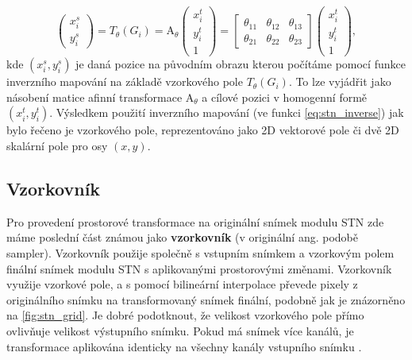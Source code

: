 \begin{equation}
\begin{pmatrix}
x_i^s \\
y_i^s
\end{pmatrix}
= T_{\theta}(G_i) = {\displaystyle \mathrm {A} }_\theta
\begin{pmatrix}
x_i^t \\
y_i^t \\
1
\end{pmatrix}
= 
\begin{bmatrix}
\theta_{11} & \theta_{12} & \theta_{13} \\
\theta_{21} & \theta_{22} & \theta_{23}
\end{bmatrix}
\begin{pmatrix}
x_i^t \\
y_i^t \\
1
\end{pmatrix},
\label{eq:stn_inverse}
\end{equation}
kde $(x_i^s, y_i^s)$ je daná pozice na původním obrazu kterou počítáme pomocí funkce inverzního mapování na základě vzorkového pole $T_{\theta}(G_i)$. To lze vyjádřit jako násobení matice afinní transformace ${\displaystyle \mathrm {A} }_\theta$ a cílové pozici v homogenní formě $(x_i^t, y_i^t)$. Výsledkem použití inverzního mapování (ve funkci \ref{eq:stn_inverse}) jak bylo řečeno je vzorkového pole, reprezentováno jako 2D vektorové pole či dvě 2D skalární pole pro osy $(x, y)$.

\subsection{Vzorkovník}

Pro provedení prostorové transformace na originální snímek modulu STN zde máme poslední část známou jako \textbf{vzorkovník} (v originální ang. podobě sampler). Vzorkovník použije společně s vstupním snímkem a vzorkovým polem finální snímek modulu STN s aplikovanými prostorovými změnami. Vzorkovník využije vzorkové pole, a s pomocí bilineární interpolace převede pixely z originálního snímku na transformovaný snímek finální, podobně jak je znázorněno na \ref{fig:stn_grid}. Je dobré podotknout, že velikost vzorkového pole přímo ovlivňuje velikost výstupního snímku. Pokud má snímek více kanálů, je transformace aplikována identicky na všechny kanály vstupního snímku \cite{stn_medium_3}.

